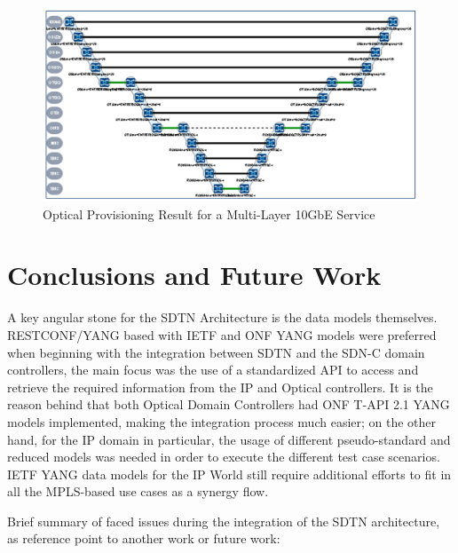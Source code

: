 \documentclass[a4paper,fleqn]{cas-dc}
\begin{document}
\begin{figure}
	\centering
		\includegraphics[width=\linewidth]{figs/optical_provisioning_result.png}
	\caption{Optical Provisioning Result for a Multi-Layer 10GbE Service}
	\label{FIG:optical_provisioning_result}
\end{figure}

\section{Conclusions and Future Work}
\label{section:conclusions}
A key angular stone for the SDTN Architecture is the data models themselves. RESTCONF/YANG based with IETF and ONF YANG models were preferred when beginning with the integration between SDTN and the SDN-C domain controllers, the main focus was the use of a standardized API to access and retrieve the required information from the IP and Optical controllers. It is the reason behind that both Optical Domain Controllers had ONF T-API 2.1 YANG models implemented, making the integration process much easier; on the other hand, for the IP domain in particular, the usage of different pseudo-standard and reduced models was needed in order to execute the different test case scenarios. IETF YANG data models for the IP World still require additional efforts to fit in all the MPLS-based use cases as a synergy flow. 

Brief summary of faced issues during the integration of the SDTN architecture, as reference point to another work or future work: 
\end{document}
